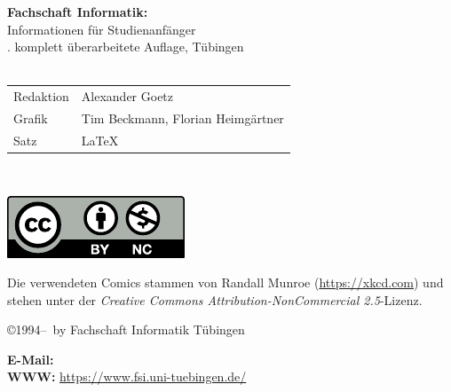 \thispagestyle{empty}

\textbf{Fachschaft Informatik:}\\
Informationen für Studienanfänger\\
\number\auflage. komplett überarbeitete Auf\/lage, Tübingen \number\jahr\\[1cm]
\medskip \\

\begin{tabular}{ll}
	Redaktion & Alexander Goetz\\ %
	Grafik & Tim Beckmann, Florian Heimgärtner \\
	Satz & \LaTeX
\end{tabular}\\

\vfill
\begin{minipage}[c]{0.1\textwidth}
	\includegraphics[width=\linewidth]{info/logos/by-nc.pdf}
\end{minipage}
\begin{minipage}[c]{0.9\textwidth}
	Die verwendeten Comics stammen von Randall Munroe (\url{https://xkcd.com}) und stehen unter der \emph{Creative Commons Attribution-NonCommercial 2.5}-Lizenz.
\end{minipage}

\copyright 1994--\number\jahr ~by Fachschaft Informatik Tübingen\\

\medskip

\textbf{E-Mail:} \hfill
{}\\
\textbf{WWW:} \hfill
\url{https://www.fsi.uni-tuebingen.de/}
\newpage
